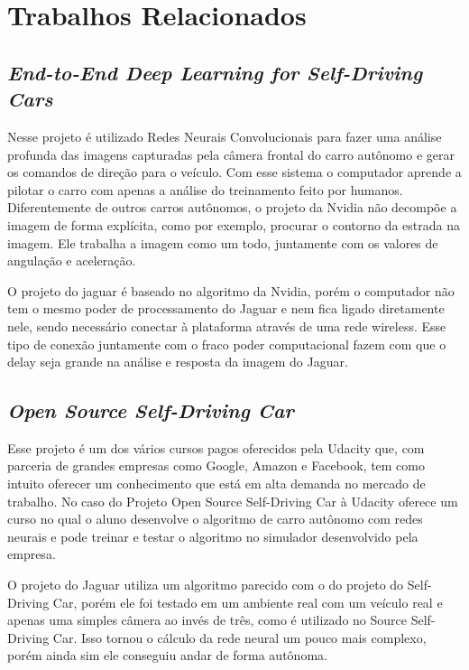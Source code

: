 \chapter{Trabalhos Relacionados}
\label{cap:trabalhos-relacionados}
\section{\textit{End-to-End Deep Learning for Self-Driving Cars}}
\label{End-to-End_Deep_Learning_for_Self-Driving_Cars}

Nesse projeto é utilizado Redes Neurais Convolucionais para fazer uma análise profunda das imagens capturadas pela câmera frontal do carro autônomo e gerar os comandos de direção para o veículo. Com esse sistema o computador aprende a pilotar o carro com apenas a análise do treinamento feito por humanos. Diferentemente de outros carros autônomos, o projeto da Nvidia não decompõe a imagem de forma explícita, como por exemplo, procurar o contorno da estrada na imagem. Ele trabalha a imagem como um todo, juntamente com os valores de angulação e aceleração. \cite{nvidiabojarski2016end}

O projeto do jaguar é baseado no algoritmo da Nvidia, porém o computador não tem o mesmo poder de processamento do Jaguar e nem fica ligado diretamente nele, sendo necessário conectar à plataforma através de uma rede wireless. Esse tipo de conexão juntamente com o fraco poder computacional fazem com que o delay seja grande na análise e resposta da imagem do Jaguar.

\section{\textit{Open Source Self-Driving Car}}
\label{Open_Source_Self-Driving_Car}

Esse projeto é um dos vários cursos pagos oferecidos pela Udacity que, com parceria de grandes empresas como Google, Amazon e Facebook, tem como intuito oferecer um conhecimento que está em alta demanda no mercado de trabalho. No caso do Projeto Open Source Self-Driving Car à Udacity oferece um curso no qual o aluno desenvolve o algoritmo de carro autônomo com redes neurais e pode treinar e testar o algoritmo no simulador desenvolvido pela empresa. \cite{self-drivingcar} 

O projeto do Jaguar utiliza um algoritmo parecido com o do projeto do Self-Driving Car, porém ele foi testado em um ambiente real com um veículo real e apenas uma simples câmera ao invés de três, como é utilizado no Source Self-Driving Car. Isso tornou o cálculo da rede neural um pouco mais complexo, porém ainda sim ele conseguiu andar de forma autônoma.

